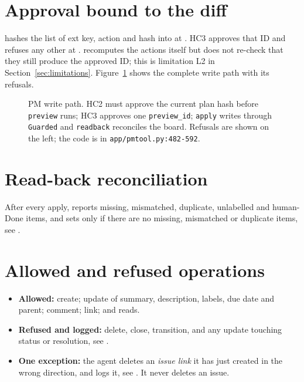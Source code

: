 \section{Approval bound to the diff}

 hashes the list of ext key, action and hash into  at . HC3 approves that ID and  refuses any other at .  recomputes the actions itself but does not re-check that they still produce the approved ID; this is limitation L2 in Section~\ref{sec:limitations}. Figure~\ref{fig:pmwrite} shows the complete write path with its refusals.

\begin{figure}[htbp]
  \centering
  \resizebox{0.97\textwidth}{!}{}
  \caption[PM write path: HC2, preview, HC3, apply and read-back]{PM write path. HC2 must approve the current plan hash before \texttt{preview} runs; HC3 approves one \texttt{preview\_id}; \texttt{apply} writes through \texttt{Guarded} and \texttt{readback} reconciles the board. Refusals are shown on the left; the code is in \texttt{app/pmtool.py:482-592}.}
  \label{fig:pmwrite}
\end{figure}

\section{Read-back reconciliation}

After every apply,  reports missing, mismatched, duplicate, unlabelled and human-Done items, and sets  only if there are no missing, mismatched or duplicate items, see .

\section{Allowed and refused operations}

\begin{itemize}[leftmargin=*,itemsep=2pt]
  \item \textbf{Allowed:} create; update of summary, description, labels, due date and parent; comment; link; and reads.
  \item \textbf{Refused and logged:} delete, close, transition, and any update touching status or resolution, see .
  \item \textbf{One exception:} the agent deletes an \emph{issue link} it has just created in the wrong direction, and logs it, see . It never deletes an issue.
\end{itemize}

